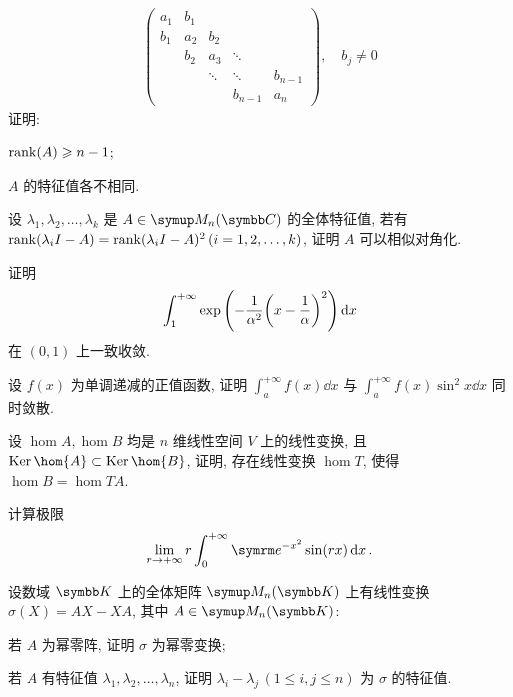 \begin{exercise}[resume=exer]
\begin{align*}
\begin{pmatrix}
                a_{1} & b_{1} & & & \\
                b_{1} & a_{2} & b_{2} & & \\
                & b_{2} & a_{3} & \ddots & \\
                & & \ddots & \ddots & b_{n-1} \\
                & & & b_{n-1} & a_{n}
            \end{pmatrix},\quad b_{j} \ne 0
        \end{align*}
        证明: 
        \begin{exercise}
            \item $ \rank(A) \geqslant n-1 $;
            \item $ A $ 的特征值各不相同. 
        \end{exercise}
        \item 设 $ \lambda_{1}, \lambda_{2}, \dots, \lambda_{k} $ 是 $ A\in \MM[\C] $ 的全体特征值, 若有 $ \rank(\lambda_{i}I - A) = \rank(\lambda_{i}I - A)^{2}\,(i = 1, 2, \dots, k) $, 证明 $ A $ 可以相似对角化.
        \item 证明
        \begin{align*}
            \int_{1}^{+\infty}\exp\qty(-\frac{1}{\alpha^{2}}\qty(x-\frac{1}{\alpha})^{2}) \dd{x}
        \end{align*}
        在 $ (0, 1) $ 上一致收敛.
        \item 设 $ f(x) $ 为单调递减的正值函数, 证明 $ \int_{a}^{+\infty} f(x) \dd{x} $ 与 $ \int_{a}^{+\infty} f(x)\sin^{2}{x} \dd{x} $ 同时敛散. 
        \item 设 $ \hom{A}, \hom{B} $ 均是 $ n $ 维线性空间 $ V $ 上的线性变换, 且 $ \Ker \hom{A} \subset \Ker \hom{B} $, 证明, 存在线性变换 $ \hom{T} $, 使得 $ \hom{B} = \hom{TA} $.
        \item 计算极限
        \begin{align*}
            \limit{r}{+\infty} r\int_{0}^{+\infty} \me^{-x^{2}}\sin(rx) \dd{x}.
        \end{align*}
        \item 设数域 $ \K $ 上的全体矩阵 $ \MM[\K] $ 上有线性变换 $ \sigma(X) = AX - XA $, 其中 $ A \in \MM[\K] $:
        \begin{exercise}
            \item 若 $ A $ 为幂零阵, 证明 $ \sigma $ 为幂零变换;
            \item 若 $ A $ 有特征值 $ \lambda_{1}, \lambda_{2}, \dots, \lambda_{n} $, 证明 $ \lambda_{i} - \lambda_{j}\,(1\le i, j\le n) $ 为 $ \sigma $ 的特征值.

\end{exercise}
\end{exercise}
